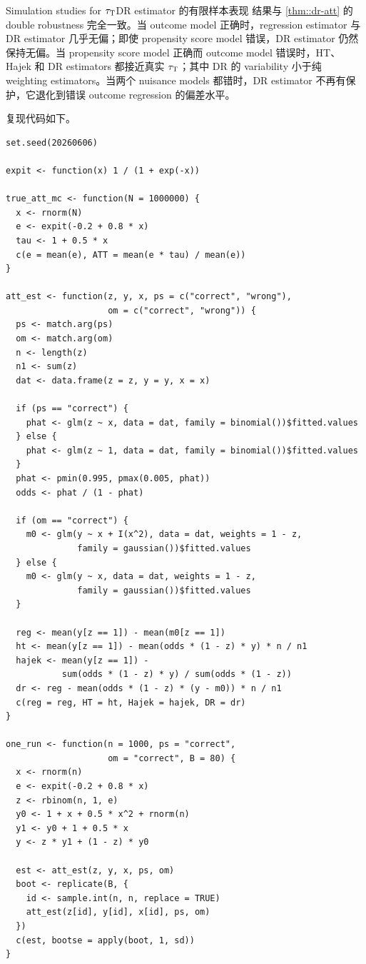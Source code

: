 \begin{exercisesolution}{Simulation studies for $\tau_\textsc{T}$}{DR estimator 的有限样本表现}
结果与 \cref{thm::dr-att} 的 double robustness 完全一致。当 outcome model 正确时，regression estimator 与 DR estimator 几乎无偏；即使 propensity score model 错误，DR estimator 仍然保持无偏。当 propensity score model 正确而 outcome model 错误时，HT、Hajek 和 DR estimators 都接近真实 $\tau_\textsc{T}$；其中 DR 的 variability 小于纯 weighting estimators。当两个 nuisance models 都错时，DR estimator 不再有保护，它退化到错误 outcome regression 的偏差水平。

复现代码如下。
\begin{lstlisting}
set.seed(20260606)

expit <- function(x) 1 / (1 + exp(-x))

true_att_mc <- function(N = 1000000) {
  x <- rnorm(N)
  e <- expit(-0.2 + 0.8 * x)
  tau <- 1 + 0.5 * x
  c(e = mean(e), ATT = mean(e * tau) / mean(e))
}

att_est <- function(z, y, x, ps = c("correct", "wrong"),
                    om = c("correct", "wrong")) {
  ps <- match.arg(ps)
  om <- match.arg(om)
  n <- length(z)
  n1 <- sum(z)
  dat <- data.frame(z = z, y = y, x = x)

  if (ps == "correct") {
    phat <- glm(z ~ x, data = dat, family = binomial())$fitted.values
  } else {
    phat <- glm(z ~ 1, data = dat, family = binomial())$fitted.values
  }
  phat <- pmin(0.995, pmax(0.005, phat))
  odds <- phat / (1 - phat)

  if (om == "correct") {
    m0 <- glm(y ~ x + I(x^2), data = dat, weights = 1 - z,
              family = gaussian())$fitted.values
  } else {
    m0 <- glm(y ~ x, data = dat, weights = 1 - z,
              family = gaussian())$fitted.values
  }

  reg <- mean(y[z == 1]) - mean(m0[z == 1])
  ht <- mean(y[z == 1]) - mean(odds * (1 - z) * y) * n / n1
  hajek <- mean(y[z == 1]) -
           sum(odds * (1 - z) * y) / sum(odds * (1 - z))
  dr <- reg - mean(odds * (1 - z) * (y - m0)) * n / n1
  c(reg = reg, HT = ht, Hajek = hajek, DR = dr)
}

one_run <- function(n = 1000, ps = "correct",
                    om = "correct", B = 80) {
  x <- rnorm(n)
  e <- expit(-0.2 + 0.8 * x)
  z <- rbinom(n, 1, e)
  y0 <- 1 + x + 0.5 * x^2 + rnorm(n)
  y1 <- y0 + 1 + 0.5 * x
  y <- z * y1 + (1 - z) * y0

  est <- att_est(z, y, x, ps, om)
  boot <- replicate(B, {
    id <- sample.int(n, n, replace = TRUE)
    att_est(z[id], y[id], x[id], ps, om)
  })
  c(est, bootse = apply(boot, 1, sd))
}


\end{lstlisting}
\end{exercisesolution}
